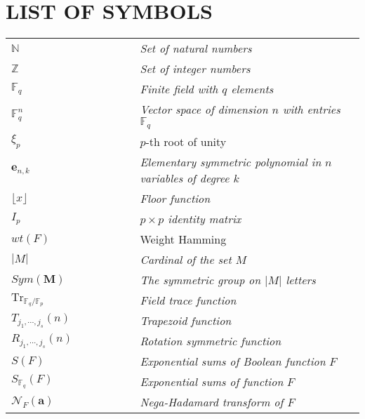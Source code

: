 
\pagebreak

\chapter*{LIST OF SYMBOLS}
%
\vspace{1cm}
\begin{spacing}{2.2}
\begin{tabular}{lcccccl}


 $\mathds{N}$    & &&    & &&                   {\it Set of natural numbers} \\
 $\mathds{Z}$    &  &&  & &&                     {\it Set of integer numbers}\\
 $\mathds{F}_q$  &  &&   & &&                    {\it Finite field with $q$ elements}\\
 $\mathds{F}_q^n$  &  &&  & &&                   {\it Vector space of dimension $n$ with entries $\mathds{F}_q$} \\
  $\xi_{p}$    &   &&  & &&                      {\it} $p$-th root of unity\\
 $\boldsymbol{e}_{n,k}$    &&&&&&         {\it Elementary symmetric polynomial in $n$ variables of degree $k$ }\\  
 $\lfloor x\rfloor$     & &&  & &&               {\it Floor function}\\
 $I_p$     &    &&     & &&                      {\it $p\times p$ identity matrix}\\
 ${wt}(F)$ &   &&    & &&             Weight Hamming\\
  $|M|$              &&&&&&   {\it Cardinal of the set $M$} \\
  $Sym(\boldsymbol{M})$              &&&&&&   {\it The symmetric group on $|M|$  letters} \\
  $\text{Tr}_{\mathbb{F}_q/\mathbb{F}_p}$  &&&&&&   {\it Field trace function}\\
  $T_{j_1,\cdots,j_s}(n)$    &&&&&&   {\it Trapezoid function} \\
  $R_{j_1,\cdots, j_s}(n)$ &&&&&&  {\it Rotation symmetric function}\\
  $S(F)$  &&&  & && {\it Exponential sums of Boolean function}  $F$\\
  $S_{\mathbb{F}_q}(F)$  &&&&&&  {\it Exponential sums of function}  $F$\\   
  $ \mathcal{N}_{F}(\boldsymbol{a})$   &&&&&&  {\it Nega-Hadamard transform of $F$}\\
 

\end{tabular}
\end{spacing}
